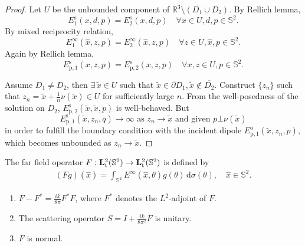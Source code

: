 \begin{proof}
  Let $U$ be the unbounded component of $\mathbb{R}^3\setminus(D_1\cup D_2)$. 
  By Rellich lemma, 
  $$E_1^\text{s}(x, d, p)=E_2^\text{s}(x, d, p)\quad\forall x\in U, d, p\in\mathbb{S}^2.$$ 
  By mixed reciprocity relation,
  $$E_1^\infty(\hat{x}, z, p)=E_2^\infty(\hat{x}, z, p)\quad\forall z\in U, \hat{x}, p\in\mathbb{S}^2.$$ 
  Again by Rellich lemma,
  $$E_{\text{p},1}^\text{s}(x, z, p)=E_{\text{p},2}^\text{s}(x, z, p)\quad\forall x, z\in U, p\in\mathbb{S}^2.$$

  Assume $D_1\not=D_2$, then $\exists\,\widetilde{x}\in U$ such that $\widetilde{x}\in\partial D_1, \widetilde{x}\not\in\overline{D_2}$. Construct $\{z_n\}$ such that $z_n=\widetilde{x}+\frac{1}{n}\nu(\widetilde{x})\in U$ for sufficiently large $n$. From the well-posedness of the solution on $D_2$, $E_{\text{p},2}^\text{s}(\widetilde{x}, \widetilde{x}, p)$ is well-behaved. But $$E_{\text{p},1}^\text{s}(\widetilde{x}, z_n, q)\to\infty\text{ as } z_n\to\widetilde{x}\text{ and given } p\bot\nu(\widetilde{x})$$ in order to fulfill the boundary condition with the incident dipole $E_{\text{p},1}^\text{o}(\widetilde{x}, z_n, p)$, which becomes unbounded as $z_n\to\widetilde{x}$.

\end{proof}

\begin{dfn}
  The far field operator $F:{\bf L}^2_\text{t}(\mathbb{S}^2)\rightarrow{\bf L}^2_\text{t}(\mathbb{S}^2)$ is defined by 
  \begin{align}
    (Fg)(\hat{x})=\int_{\mathbb{S}^2} E^\infty(\hat{x}, \theta)g(\theta)\,\text{d}\sigma(\theta),\quad\hat{x}\in \mathbb{S}^2.
  \end{align}
\end{dfn}
\begin{prp}
  \begin{enumerate}
    \item $F - F^* = \frac{ik}{8\pi}F^*F$, where $F^*$ denotes the $L^2$-adjoint of $F$.
    \item The scattering operator $S=I+\frac{ik}{8\pi^2}F$ is unitary.
    \item $F$ is normal.
  \end{enumerate}
\end{prp}

